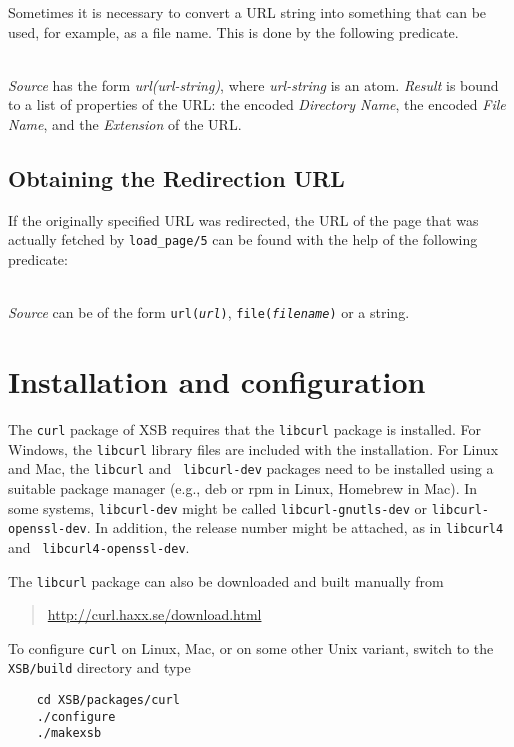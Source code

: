Sometimes it is necessary to convert a URL string into something that can
be used, for example, as a file name. This is done by the following
predicate.

\begin{description}
\item[encode\_url({\it +Source, -Result})]\mbox{}
  \\
{\it Source} has the form {\it url(url-string)}, where
\emph{url-string} is an atom.
{\it Result} is bound to a list of properties of the URL:
the encoded {\it Directory Name}, the encoded {\it File Name}, and the {\it
  Extension} of the URL.

\end{description}

\subsection{Obtaining the Redirection URL}

If the originally specified URL was redirected, the URL of the page that
was actually fetched by {\tt load\_page/5} can be found with the help of
the following predicate: 

\begin{description}
\item[get\_redir\_url({\it +Source, -UrlNew})]\mbox{}
  \\
  {\it Source} can be of the form {\tt url({\it {url}})}, {\tt file({\it {filename}})} or a string.

\end{description}

\section{Installation and configuration}

The {\tt curl} package of XSB requires that the {\tt libcurl} package is
installed.  For Windows, the {\tt libcurl} library files are included with
the installation. For Linux and Mac, the {\tt libcurl} and {\tt
  libcurl-dev} packages need to be installed using a suitable
package manager (e.g., deb or rpm in Linux, Homebrew in Mac). In some
systems, {\tt libcurl-dev} might be
called {\tt libcurl-gnutls-dev} or {\tt libcurl-openssl-dev}.  In addition,
the release number might be attached, as in {\tt libcurl4} and {\tt
  libcurl4-openssl-dev}.

The {\tt libcurl} package can also be downloaded and
built manually from
\begin{quote}
  \url{http://curl.haxx.se/download.html} 
\end{quote}
To configure {\tt curl} on Linux, Mac, or on some other Unix variant,
switch to the {\tt XSB/build} directory and type

\begin{verbatim}
    cd XSB/packages/curl
    ./configure
    ./makexsb
\end{verbatim}

